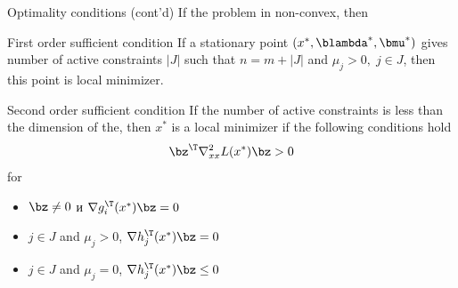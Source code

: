 \documentclass[12pt]{beamer}
\begin{document}
\begin{frame}{Optimality conditions (cont'd)}
\small
If the problem in non-convex, then
\begin{block}{First order sufficient condition}
\small
If a stationary point $(x^*, \blambda^*, \bmu^*)$ gives number of active constraints $|J|$ such that $n = m + |J|$ and $\mu_j > 0, \; j \in J$, then this point is local minimizer.
\end{block}

\begin{block}{Second order sufficient condition}
\small
If the number of active constraints is less than the dimension of the, then $x^*$ is a local minimizer if the following conditions hold
\vspace{-3mm}
\[
\bz^{\T}\nabla_{xx}^2 L(x^*)\bz > 0
\vspace{-3mm}
\] 
for 
\vspace{-4mm}
\begin{itemize}
\item $\bz \neq 0$ и $\nabla g^{\T}_i(x^*)\bz = 0$
\vspace{-3mm}
\item $j \in J$ and $\mu_j > 0$, $\nabla h^{\T}_j(x^*) \bz = 0$
\vspace{-3mm}
\item $j \in J$ and $\mu_j = 0$, $\nabla h^{\T}_j(x^*) \bz \leq 0$
\end{itemize}
\end{block}

\end{frame}
\end{document}
